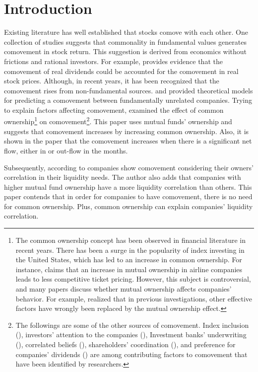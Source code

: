 \section{Introduction}

Existing literature has well established that stocks comove with each other. One collection of studies suggests that commonality in fundamental values generates comovement in stock return. This suggestion is derived from economics without frictions and rational investors. For example, \cite{shiller1989comovements} provides evidence that the comovement of real dividends could be accounted for the comovement in real stock prices.
	Although, in recent years, it has been recognized that the comovement rises from non-fundamental sources. {\cite{barberis2003style} and \cite{barberis2005comovement}} provided theoretical models for predicting a comovement between fundamentally unrelated companies. Trying to explain factors affecting comovement, {\cite{AntonPolk}} examined the effect of common ownership\footnote{The common ownership concept has been observed in financial literature in recent years. There has been a surge in the popularity of index investing in the United States, which has led to an increase in common ownership. 
			For instance, \cite{azar2018anticompetitive} claims that an increase in mutual ownership in airline companies leads to less competitive ticket pricing. However, this subject is controversial, and many papers discuss whether mutual ownership affects companies' behavior.
			For example, \cite{lewellen2021does} realized that in previous investigations, other effective factors have wrongly been replaced by the mutual ownership effect.
		} on comovement\footnote{	The followings are some of the other sources of comovement. Index inclusion ({\cite{barberis2005comovement}}), investors' attention to the companies ({\cite{wu2014investor}}), Investment banks' underwriting ({\cite{grullon2014comovement}}), correlated beliefs ({\cite{david2016correlated}}), shareholders' coordination ({\cite{pantzalis2017shareholder}}), and preference for companies' dividends ({\cite{HAMEED2019103}}) are among contributing factors to comovement that have been identified by researchers.}. This paper uses mutual funds' ownership and suggests that comovement increases by increasing common ownership. Also, it is shown in the paper that the comovement increases when there is a significant net flow, either in or out-flow in the months.
	
	Subsequently, according to {\cite{Liquidity2016}} companies show comovement considering their owners' correlation in their liquidity needs. The author also adds that companies with higher mutual fund ownership have a more liquidity correlation than others. This paper contends that in order for companies to have comovement, there is no need for common ownership. Plus, common ownership can explain companies'  liquidity correlation. 
	
